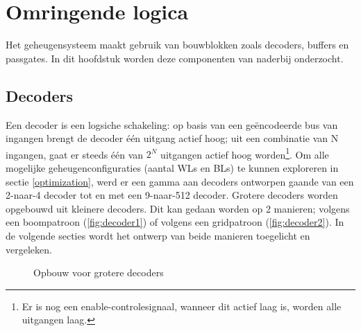 \chapter{Omringende logica}
\label{periphery}

Het geheugensysteem maakt gebruik van bouwblokken zoals decoders, buffers en passgates.
In dit hoofdstuk worden deze componenten van naderbij onderzocht.

\section{Decoders}
Een decoder is een logsiche schakeling: op basis van een geëncodeerde bus van ingangen brengt de decoder één uitgang actief hoog; uit een combinatie van N ingangen, gaat er steeds één van $2^N$ uitgangen actief hoog worden\footnote{Er is nog een enable-controlesignaal, wanneer dit actief laag is, worden alle uitgangen laag.}. Om alle mogelijke geheugenconfiguraties (aantal WLs en BLs) te kunnen exploreren in sectie \ref{optimization}, werd er een gamma aan decoders ontworpen gaande van een 2-naar-4 decoder tot en met een 9-naar-512 decoder. Grotere decoders worden opgebouwd uit kleinere decoders. Dit kan gedaan worden op 2 manieren; volgens een boompatroon (\ref{fig:decoder1}) of volgens een gridpatroon (\ref{fig:decoder2}). In de volgende secties wordt het ontwerp van beide manieren toegelicht en vergeleken.

\begin{figure}[!ht]
\centering
{}
\caption[Types decoders]{Opbouw voor grotere decoders}\label{fig:basisdecoders}
\end{figure}

